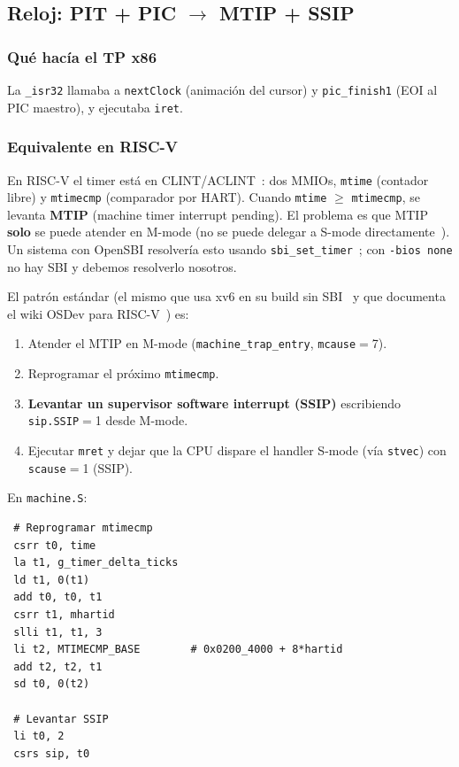\subsection{Reloj: PIT + PIC $\to$ MTIP + SSIP}
\label{sec:reloj}

\subsubsection*{Qué hacía el TP x86}

La \texttt{\_isr32} llamaba a \texttt{nextClock} (animación del cursor) y \texttt{pic\_finish1} (EOI al PIC maestro), y
ejecutaba \texttt{iret}.

\subsubsection*{Equivalente en RISC-V}

En RISC-V el timer está en CLINT/ACLINT~\cite{riscv-aclint}: dos MMIOs, \texttt{mtime} (contador libre) y
\texttt{mtimecmp} (comparador por HART). Cuando \texttt{mtime} $\geq$ \texttt{mtimecmp}, se levanta \textbf{MTIP}
(machine timer interrupt pending). El problema es que MTIP \textbf{solo} se puede atender en M-mode (no se puede delegar
a S-mode directamente~\cite{riscv-priv}). Un sistema con OpenSBI resolvería esto usando
\texttt{sbi\_set\_timer}~\cite{riscv-sbi}; con \texttt{-bios none} no hay SBI y debemos resolverlo nosotros.

El patrón estándar (el mismo que usa xv6 en su build sin SBI~\cite{xv6-riscv} y que documenta el wiki OSDev para
RISC-V~\cite{osdev-riscv}) es:

\begin{enumerate}
  \item Atender el MTIP en M-mode (\texttt{machine\_trap\_entry}, \texttt{mcause}$=$7).
  \item Reprogramar el próximo \texttt{mtimecmp}.
  \item \textbf{Levantar un supervisor software interrupt (SSIP)} escribiendo \texttt{sip.SSIP}$=$1 desde M-mode.
  \item Ejecutar \texttt{mret} y dejar que la CPU dispare el handler S-mode (vía \texttt{stvec}) con \texttt{scause}$=$1
  (SSIP).
\end{enumerate}

En \texttt{machine.S}:

\begin{codesnippet}
\begin{verbatim}
 # Reprogramar mtimecmp
 csrr t0, time
 la t1, g_timer_delta_ticks
 ld t1, 0(t1)
 add t0, t0, t1
 csrr t1, mhartid
 slli t1, t1, 3
 li t2, MTIMECMP_BASE        # 0x0200_4000 + 8*hartid
 add t2, t2, t1
 sd t0, 0(t2)

 # Levantar SSIP
 li t0, 2
 csrs sip, t0
\end{verbatim}
\end{codesnippet}

